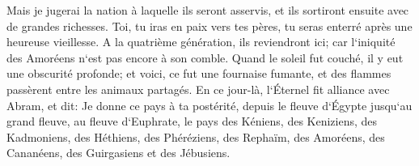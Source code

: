 \verse Mais je jugerai la nation à laquelle ils seront asservis, et ils sortiront ensuite avec de grandes richesses. 
\verse Toi, tu iras en paix vers tes pères, tu seras enterré après une heureuse vieillesse. 
\verse A la quatrième génération, ils reviendront ici; car l`iniquité des Amoréens n`est pas encore à son comble. 
\verse Quand le soleil fut couché, il y eut une obscurité profonde; et voici, ce fut une fournaise fumante, et des flammes passèrent entre les animaux partagés. 
\verse En ce jour-là, l`Éternel fit alliance avec Abram, et dit: Je donne ce pays à ta postérité, depuis le fleuve d`Égypte jusqu`au grand fleuve, au fleuve d`Euphrate, 
\verse le pays des Kéniens, des Keniziens, des Kadmoniens, 
\verse des Héthiens, des Phéréziens, des Rephaïm, 
\verse des Amoréens, des Cananéens, des Guirgasiens et des Jébusiens. 

